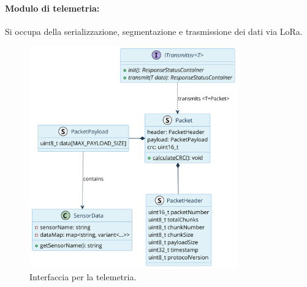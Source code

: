 \documentclass[12pt,a4paper,twoside]{book}
\begin{document}
\paragraph{\textbf{Modulo di telemetria:}}Si occupa della serializzazione, segmentazione
e trasmissione dei dati via \ac{LoRa}.
\begin{figure}[H]
    \centering
    \includegraphics[width=0.8\textwidth]{img/uml/transmitter.png}
    \caption{Interfaccia per la telemetria.}
    \label{fig:flight-computer-telemetry}
\end{figure}
\newpage
\end{document}
